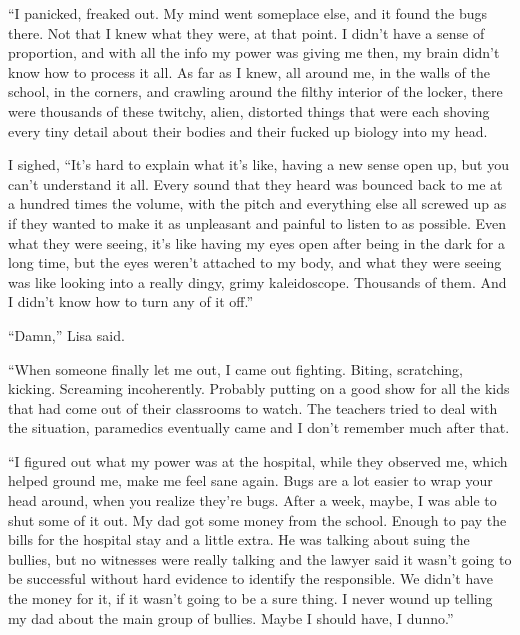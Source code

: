 ``I panicked, freaked out.  My mind went someplace else, and it found the bugs there.  Not that I knew what they were, at that point.  I didn't have a sense of proportion, and with all the info my power was giving me then, my brain didn't know how to process it all.  As far as I knew, all around me, in the walls of the school, in the corners, and crawling around the filthy interior of the locker, there were thousands of these twitchy, alien, distorted things that were each shoving every tiny detail about their bodies and their fucked up biology into my head.



I sighed, ``It's hard to explain what it's like, having a new sense open up, but you can't understand it all.  Every sound that they heard was bounced back to me at a hundred times the volume, with the pitch and everything else all screwed up as if they wanted to make it as unpleasant and painful to listen to as possible.  Even what they were seeing, it's like having my eyes open after being in the dark for a long time, but the eyes weren't attached to my body, and what they were seeing was like looking into a really dingy, grimy kaleidoscope.  Thousands of them.  And I didn't know how to turn any of it off.''



``Damn,'' Lisa said.



``When someone finally let me out, I came out fighting.  Biting, scratching, kicking.  Screaming incoherently.  Probably putting on a good show for all the kids that had come out of their classrooms to watch.  The teachers tried to deal with the situation, paramedics eventually came and I don't remember much after that.



``I figured out what my power was at the hospital, while they observed me, which helped ground me, make me feel sane again.  Bugs are a lot easier to wrap your head around, when you realize they're bugs.  After a week, maybe, I was able to shut some of it out.  My dad got some money from the school.  Enough to pay the bills for the hospital stay and a little extra.  He was talking about suing the bullies, but no witnesses were really talking and the lawyer said it wasn't going to be successful without hard evidence to identify the responsible.  We didn't have the money for it, if it wasn't going to be a sure thing.  I never wound up telling my dad about the main group of bullies.  Maybe I should have, I dunno.''



